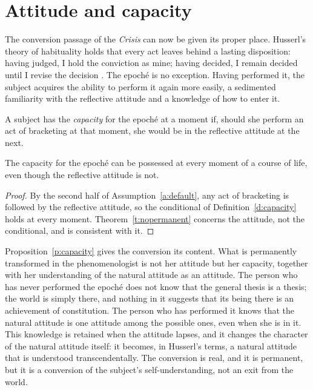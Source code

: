 \documentclass{situationist-preprint}
\begin{document}
\section{Attitude and capacity}\label{s:habit}

The conversion passage of the \emph{Crisis} can now be given its proper place. Husserl's theory of habituality holds that every act leaves behind a lasting disposition: having judged, I hold the conviction as mine; having decided, I remain decided until I revise the decision \citep[§32]{Husserl1950}. The epoché is no exception. Having performed it, the subject acquires the ability to perform it again more easily, a sedimented familiarity with the reflective attitude and a knowledge of how to enter it.

\begin{definition}\label{d:capacity}
A subject has the \emph{capacity} for the epoché at a moment if, should she perform an act of bracketing at that moment, she would be in the reflective attitude at the next.
\end{definition}

\begin{proposition}\label{p:capacity}
The capacity for the epoché can be possessed at every moment of a course of life, even though the reflective attitude is not.
\end{proposition}

\begin{proof}
By the second half of Assumption~\ref{a:default}, any act of bracketing is followed by the reflective attitude, so the conditional of Definition~\ref{d:capacity} holds at every moment. Theorem~\ref{t:nopermanent} concerns the attitude, not the conditional, and is consistent with it.
\end{proof}

Proposition~\ref{p:capacity} gives the conversion its content. What is permanently transformed in the phenomenologist is not her attitude but her capacity, together with her understanding of the natural attitude as an attitude. The person who has never performed the epoché does not know that the general thesis is a thesis; the world is simply there, and nothing in it suggests that its being there is an achievement of constitution. The person who has performed it knows that the natural attitude is one attitude among the possible ones, even when she is in it. This knowledge is retained when the attitude lapses, and it changes the character of the natural attitude itself: it becomes, in Husserl's terms, a natural attitude that is understood transcendentally. The conversion is real, and it is permanent, but it is a conversion of the subject's self-understanding, not an exit from the world.
\end{document}
